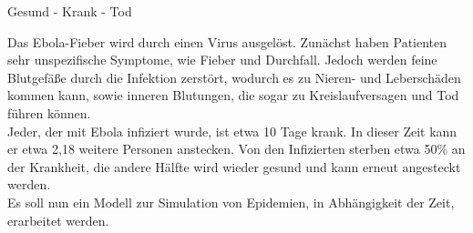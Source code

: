 \documentclass[11pt]{beamer}
\begin{document}


\begin{frame}{Gesund - Krank - Tod}

Das Ebola-Fieber wird durch einen Virus ausgelöst. Zunächst haben Patienten sehr unspezifische Symptome, wie Fieber und Durchfall. Jedoch werden feine Blutgefäße durch die Infektion zerstört, wodurch es zu Nieren- und Leberschäden kommen kann, sowie inneren Blutungen, die sogar zu Kreislaufversagen und Tod führen können.\\
Jeder, der mit Ebola infiziert wurde, ist etwa 10 Tage krank. In dieser Zeit kann er etwa 2,18 weitere Personen anstecken. Von den Infizierten sterben etwa 50\% an der Krankheit, die andere Hälfte wird wieder gesund und kann erneut angesteckt werden.\\

Es soll nun ein Modell zur Simulation von Epidemien, in Abhängigkeit der Zeit, erarbeitet werden.\\
\end{frame}
\end{document}

